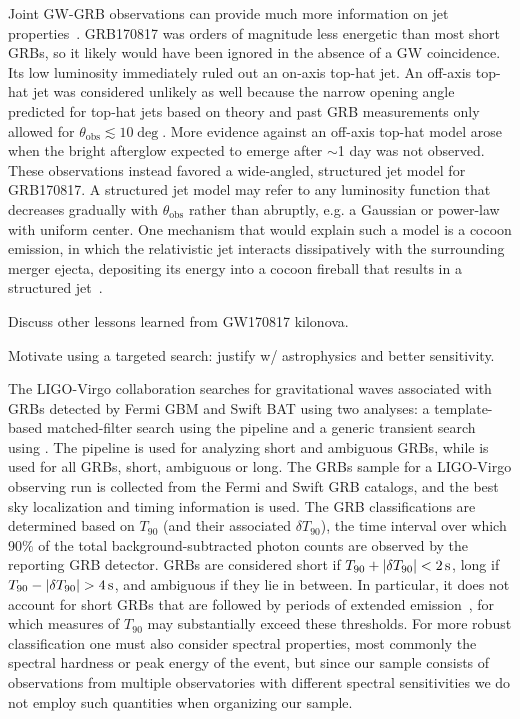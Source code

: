 Joint GW-GRB observations can provide much more information on jet properties~\citep{Mogushi_2019, Farah_2020}.
GRB170817 was orders of magnitude less energetic than most short \acp{GRB}, so it likely would have been ignored in the absence of a \ac{GW} coincidence.
Its low luminosity immediately ruled out an on-axis top-hat jet.
An off-axis top-hat jet was considered unlikely as well because the narrow opening angle predicted for top-hat jets based on theory and past \ac{GRB} measurements only allowed for $\theta_{\mathrm{obs}} \lesssim 10\deg$.
More evidence against an off-axis top-hat model arose when the bright afterglow expected to emerge after $\sim$1 day was not observed.
These observations instead favored a wide-angled, structured jet model for GRB170817.
A structured jet model may refer to any luminosity function that decreases gradually with $\theta_{\mathrm{obs}}$ rather than abruptly, e.g. a Gaussian or power-law with uniform center.
One mechanism that would explain such a model is a cocoon emission, in which the relativistic jet interacts dissipatively with the surrounding merger ejecta, depositing its energy into a cocoon fireball that results in a structured jet~\citep{gw170817_grb}.

{\color{red}Discuss other lessons learned from GW170817 kilonova.}

{\color{red}Motivate using a targeted search: justify w/ astrophysics and better sensitivity.}

The \ac{LIGO}-Virgo collaboration searches for gravitational waves associated with \acp{GRB} detected by Fermi \ac{GBM} and Swift \ac{BAT} using two analyses: a template-based matched-filter search using the \pygrb pipeline and a generic transient search using \xpip.
The \pygrb pipeline is used for analyzing short and ambiguous \acp{GRB}, while \xpip is used for all \acp{GRB}, short, ambiguous or long.
The \acp{GRB} sample for a LIGO-Virgo observing run is collected from the Fermi and Swift \ac{GRB} catalogs, and the best sky localization and timing information is used.
The \ac{GRB} classifications are determined based on $T_{90}$ (and their associated $\delta T_{90}$), the time interval over which 90\% of the total background-subtracted photon counts are observed by the reporting \ac{GRB} detector.
\Acp{GRB} are considered short if $T_{90} + \abs{\delta T_{90}} < 2\,\text{s}$, long if $T_{90} - \abs{\delta T_{90}} > 4\,\text{s}$, and ambiguous if they lie in between.
In particular, it does not account for short GRBs that are followed by periods of extended emission~\citep{Norris_2006, vanPutten_2014}, for which measures of $T_{90}$ may substantially exceed these thresholds.
For more robust classification one must also consider spectral properties, most commonly the spectral hardness or peak energy of the event, but since our sample consists of observations from multiple observatories with different spectral sensitivities we do not employ such quantities when organizing our sample.


